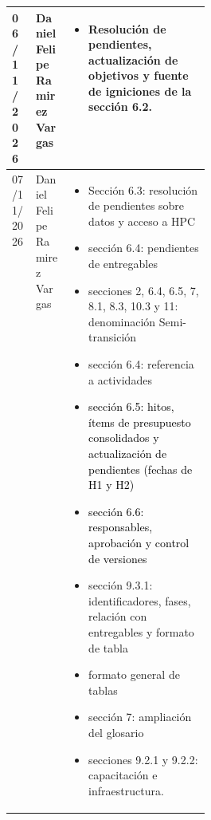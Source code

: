 \begin{longtable}{|p{0.12\linewidth}|p{0.17\linewidth}|p{}|}
06/11/2026 & Daniel Felipe Ramirez Vargas & \vspace{-\baselineskip}\begin{itemize}\setlength{\itemsep}{0pt}\setlength{\parskip}{0pt}\setlength{\topsep}{0pt} \item Resolución de pendientes, actualización de objetivos y fuente de igniciones de la sección 6.2.\end{itemize}\\\hline
07/11/2026 & Daniel Felipe Ramirez Vargas & \vspace{-\baselineskip}\begin{itemize}\setlength{\itemsep}{0pt}\setlength{\parskip}{0pt}\setlength{\topsep}{0pt} \item Sección 6.3: resolución de pendientes sobre datos y acceso a HPC \item sección 6.4: pendientes de entregables \item secciones 2, 6.4, 6.5, 7, 8.1, 8.3, 10.3 y 11: denominación Semi-transición \item sección 6.4: referencia a actividades \item \textcolor{black}{sección 6.5: hitos, ítems de presupuesto consolidados y actualización de pendientes} \textcolor{black}{(fechas de H1 y H2)} \item \textcolor{black}{sección 6.6: responsables, aprobación y control de versiones} \item sección 9.3.1: identificadores, fases, relación con entregables y formato de tabla \item formato general de tablas \item sección 7: ampliación del glosario \item secciones 9.2.1 y 9.2.2: capacitación e infraestructura.\end{itemize}\\\hline


\end{longtable}
